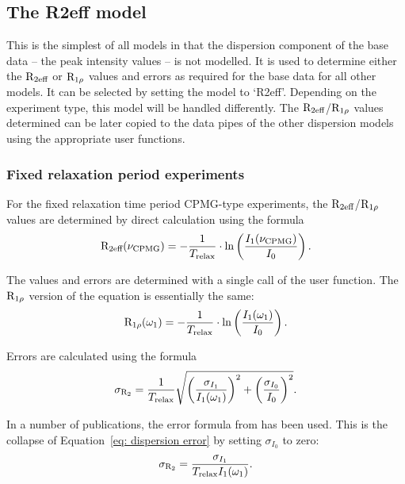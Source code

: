 
\subsection{The R2eff model}
\label{sect: dispersion: R2eff model}

This is the simplest of all models in that the dispersion component of the base data -- the peak intensity values -- is not modelled.
It is used to determine either the $\mathrm{R}_\textrm{2eff}$ or $\mathrm{R}_{1\rho}$ values and errors as required for the base data for all other models.
It can be selected by setting the model to `R2eff'.
Depending on the experiment type, this model will be handled differently.
The $\mathrm{R}_\textrm{2eff}$/$\mathrm{R}_{1\rho}$ values determined can be later copied to the data pipes of the other dispersion models using the appropriate user functions.


\subsubsection{Fixed relaxation period experiments}

For the fixed relaxation time period CPMG-type experiments, the $\mathrm{R}_\textrm{2eff}$/$\mathrm{R}_{1\rho}$ values are determined by direct calculation using the formula
\begin{equation}
    \mathrm{R}_\textrm{2eff}(\nu_\textrm{CPMG}) = - \frac{1}{T_\textrm{relax}} \cdot \ln \left( \frac{I_1(\nu_\textrm{CPMG})}{I_0} \right) .
\end{equation}

The values and errors are determined with a single call of the  user function.
The $\mathrm{R}_{1\rho}$ version of the equation is essentially the same:
\begin{equation}
    \mathrm{R}_{1\rho}(\omega_1) = - \frac{1}{T_\textrm{relax}} \cdot \ln \left( \frac{I_1(\omega_1)}{I_0} \right) .
\end{equation}

Errors are calculated using the formula
\begin{equation} \label{eq: dispersion error}
    \sigma_{\mathrm{R}_2} = \frac{1}{T_\textrm{relax}} \sqrt{ \left( \frac{\sigma_{I_1}}{I_1(\omega_1)} \right)^2  +  \left( \frac{\sigma_{I_0}}{I_0} \right)^2 } .
\end{equation}

In a number of publications, the error formula from \citet{IshimaTorchia05} has been used.
This is the collapse of Equation~\ref{eq: dispersion error} by setting $\sigma_{I_0}$ to zero:
\begin{equation} \label{eq: IT05 dispersion error}
    \sigma_{\mathrm{R}_2} = \frac{\sigma_{I_1}}{T_\textrm{relax} I_1(\omega_1)} .
\end{equation}

